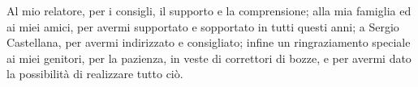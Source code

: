 \begin{center}
Al mio relatore, per i consigli, il supporto e la comprensione; alla mia famiglia ed ai miei amici, per avermi supportato e sopportato in tutti questi anni; a Sergio Castellana, per avermi indirizzato e consigliato; infine un ringraziamento speciale ai miei genitori, per la pazienza, in veste di correttori di bozze, e per avermi dato la possibilità di realizzare tutto ciò.
\end{center}